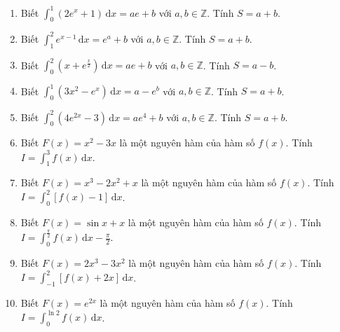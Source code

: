 \documentclass[12pt]{article}
\begin{document}
\begin{enumerate}[label=\textbf{Câu \arabic*.}]
		\item Biết $\displaystyle \int_0^1 (2e^x + 1)\,\mathrm{d}x = a e + b$ với $a, b \in \mathbb{Z}$. Tính $S = a + b$.
		\vspace{0.75cm}
		
		\item Biết $\displaystyle \int_1^2 e^{x-1}\,\mathrm{d}x = e^a + b$ với $a, b \in \mathbb{Z}$. Tính $S = a + b$.
		\vspace{0.75cm}
		
		\item Biết $\displaystyle \int_0^2 \left(x + e^{\frac{x}{2}}\right)\,\mathrm{d}x = a e + b$ với $a, b \in \mathbb{Z}$. Tính $S = a - b$.
		\vspace{0.75cm}
		
		\item Biết $\displaystyle \int_0^1 (3x^2 - e^x)\,\mathrm{d}x = a - e^b$ với $a, b \in \mathbb{Z}$. Tính $S = a + b$.
		\vspace{0.75cm}
		
		\item Biết $\displaystyle \int_0^2 (4e^{2x} - 3)\,\mathrm{d}x = a e^4 + b$ với $a, b \in \mathbb{Z}$. Tính $S = a + b$.
		\vspace{0.75cm}
		
		\item Biết $F(x) = x^2 - 3x$ là một nguyên hàm của hàm số $f(x)$. Tính $I = \displaystyle \int_1^3 f(x)\,\mathrm{d}x$.
		\vspace{0.75cm}
		
		\item Biết $F(x) = x^3 - 2x^2 + x$ là một nguyên hàm của hàm số $f(x)$. Tính $I = \displaystyle \int_0^2 [f(x) - 1]\,\mathrm{d}x$.
		\vspace{0.75cm}
		
		\item Biết $F(x) = \sin x + x$ là một nguyên hàm của hàm số $f(x)$. Tính $I = \displaystyle \int_0^{\frac{\pi}{2}} f(x)\,\mathrm{d}x - \frac{\pi}{2}$.
		\vspace{0.75cm}
		
		\item Biết $F(x) = 2x^3 - 3x^2$ là một nguyên hàm của hàm số $f(x)$. Tính $I = \displaystyle \int_{-1}^2 [f(x) + 2x]\,\mathrm{d}x$.
		\vspace{0.75cm}
		
		\item Biết $F(x) = e^{2x}$ là một nguyên hàm của hàm số $f(x)$. Tính $I = \displaystyle \int_0^{\ln 2} f(x)\,\mathrm{d}x$.
		\vspace{0.75cm}
		

\end{enumerate}
\end{document}
